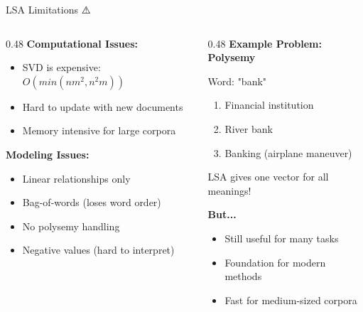 \documentclass[aspectratio=169]{beamer}
\begin{document}
\begin{frame}[shrink=10]{LSA Limitations ⚠️}
\begin{columns}[T]
\begin{column}{0.48\textwidth}
\textbf{Computational Issues:}
\begin{itemize}\setlength{\itemsep}{0pt}
    \item SVD is expensive: $O(min(nm^2, n^2m))$
    \item Hard to update with new documents
    \item Memory intensive for large corpora
\end{itemize}

\vspace{1em}
\textbf{Modeling Issues:}
\begin{itemize}\setlength{\itemsep}{0pt}
    \item Linear relationships only
    \item Bag-of-words (loses word order)
    \item No polysemy handling
    \item Negative values (hard to interpret)
\end{itemize}
\end{column}

\begin{column}{0.48\textwidth}
\textbf{Example Problem: Polysemy}

\vspace{0.5em}
\begin{exampleblock}{Word: "bank"}
\begin{enumerate}\setlength{\itemsep}{0pt}
    \item Financial institution
    \item River bank
    \item Banking (airplane maneuver)
\end{enumerate}
\end{exampleblock}

\vspace{0.5em}
LSA gives \alert{one vector} for all meanings!

\vspace{1em}
\textbf{But...}
\begin{itemize}\setlength{\itemsep}{0pt}
    \item Still useful for many tasks
    \item Foundation for modern methods
    \item Fast for medium-sized corpora
\end{itemize}
\end{column}
\end{columns}
\end{frame}
\end{document}
